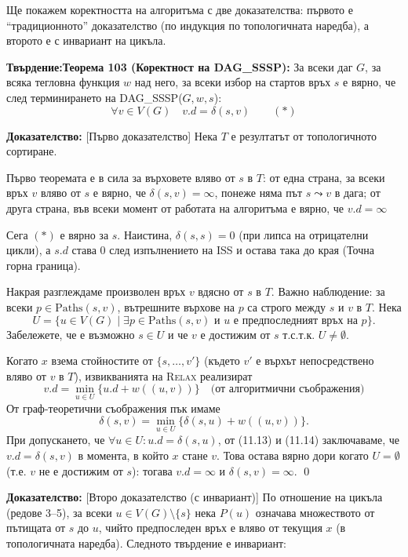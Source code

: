 \documentclass{article}
\renewcommand{\\}{\newline}
\newcommand{\tv}{\textbf{Твърдение:\;}}
\newcommand{\doc}{\textbf{Доказателство: }}
\begin{document}
Ще покажем коректността на алгоритъма с две доказателства: първото е ``традиционното'' доказателство (по индукция по топологичната наредба), а второто е с инвариант на цикъла.

\tv \textbf{Теорема 103 (Коректност на DAG\_SSSP):}
За всеки даг \(G\), за всяка тегловна функция \(w\) над него, за всеки избор на стартов връх \(s\) е вярно, че след терминирането на DAG\_SSSP(\(G, w, s\)):
\[
  \forall v \in V(G) \quad v.d = \delta(s, v) \qquad (*)
\]

\doc[Първо доказателство]
Нека \(T\) е резултатът от топологичното сортиране.

Първо теоремата е в сила за върховете вляво от \(s\) в \(T\): от една страна, за всеки връх \(v\) вляво от \(s\) е вярно, че \(\delta(s, v) = \infty\), понеже няма път \(s \leadsto v\) в дага; от друга страна, във всеки момент от работата на алгоритъма е вярно, че \(v.d = \infty\) 

Сега \((*)\)   е вярно за \(s\). Наистина, \(\delta(s, s) = 0\) (при липса на отрицателни цикли), а \(s.d\) става \(0\) след изпълнението на ISS и остава така до края (Точна горна граница).

Накрая разглеждаме произволен връх \(v\) вдясно от \(s\) в \(T\). Важно наблюдение: за всеки \(p \in \text{Paths}(s, v)\), вътрешните върхове на \(p\) са строго между \(s\) и \(v\) в \(T\). Нека
\[
U = \{ u \in V(G) \mid \exists p \in \text{Paths}(s, v) \text{ и } u \text{ е предпоследният връх на } p \}.
\]
Забележете, че е възможно \(s \in U\) и че \(v\) е достижим от \(s\) т.с.т.к. \(U \ne \emptyset\).

Когато \(x\) взема стойностите от \(\{s, \dots, v'\}\) (където \(v'\) е върхът непосредствено вляво от \(v\) в \(T\)), извикванията на \textsc{Relax} реализират
\[
v.d = \min_{u \in U} \{ u.d + w((u,v)) \} \quad \text{(от алгоритмични съображения)} \tag{11.13}
\]
От граф-теоретични съображения пък имаме
\[
\delta(s, v) = \min_{u \in U} \{ \delta(s, u) + w((u,v)) \}. \tag{11.14}
\]
При допускането, че \(\forall u \in U : u.d = \delta(s, u)\), от (11.13) и (11.14) заключаваме, че \(v.d = \delta(s, v)\) в момента, в който \(x\) стане \(v\). Това остава вярно дори когато \(U = \emptyset\) (т.е. \(v\) не е достижим от \(s\)): тогава \(v.d = \infty\) и \(\delta(s, v) = \infty\). \qed

\doc[Второ доказателство (с инвариант)]
По отношение на цикъла (редове 3–5), за всеки \(u \in V(G)\setminus\{s\}\) нека \(P(u)\) означава множеството от пътищата от \(s\) до \(u\), чийто предпоследен връх е вляво от текущия \(x\) (в топологичната наредба). Следното твърдение е инвариант:
\end{document}
